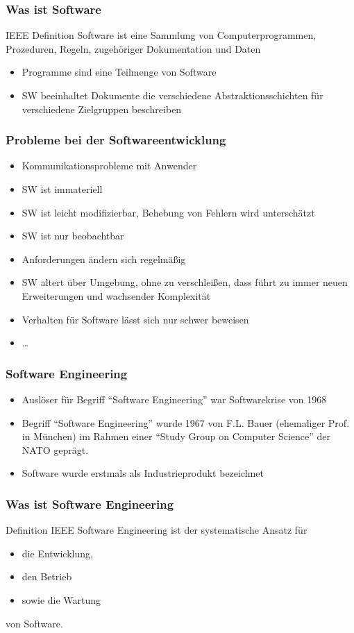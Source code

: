 \begin{frame}
\frametitle{Was ist Software}
	\begin{block}{IEEE Definition}
		Software ist eine Sammlung von Computerprogrammen, Prozeduren, Regeln,
		zugehöriger Dokumentation und Daten
		\begin{itemize}
			 \item Programme sind eine Teilmenge von Software
			 \item SW beeinhaltet Dokumente die verschiedene Abstraktionsschichten
			 für verschiedene Zielgruppen beschreiben
		\end{itemize}
	\end{block}
\end{frame}

\begin{frame}
\frametitle{Probleme bei der Softwareentwicklung}
	\begin{itemize}
		 \item Kommunikationsprobleme mit Anwender
		 \item SW ist immateriell
		 \item SW ist leicht modifizierbar, Behebung von Fehlern wird unterschätzt
		 \item SW ist nur beobachtbar
		 \item Anforderungen ändern sich regelmäßig
		 \item SW altert über Umgebung, ohne zu verschleißen,
		 dass führt zu immer neuen Erweiterungen und wachsender Komplexität
		 \item Verhalten für Software lässt sich nur schwer beweisen
		 \item \ldots
	\end{itemize}
\end{frame}

\begin{frame}
\frametitle{Software Engineering}
	\begin{itemize}
		\item Auslöser für Begriff ``Software Engineering'' war Softwarekrise von 1968
		\item Begriff ``Software Engineering'' wurde 1967 von F.L. Bauer (ehemaliger Prof. in München)
		im Rahmen einer ``Study Group on Computer Science'' der NATO geprägt.
		\item Software wurde erstmals als Industrieprodukt bezeichnet
	\end{itemize}
\end{frame}

\begin{frame}
\frametitle{Was ist Software Engineering}
	\begin{block}{Definition IEEE}
		Software Engineering ist der systematische Ansatz für
		\begin{itemize}
			\item die Entwicklung,
			\item den Betrieb
			\item sowie die Wartung
		\end{itemize}
		von Software.
	\end{block}
\end{frame}

